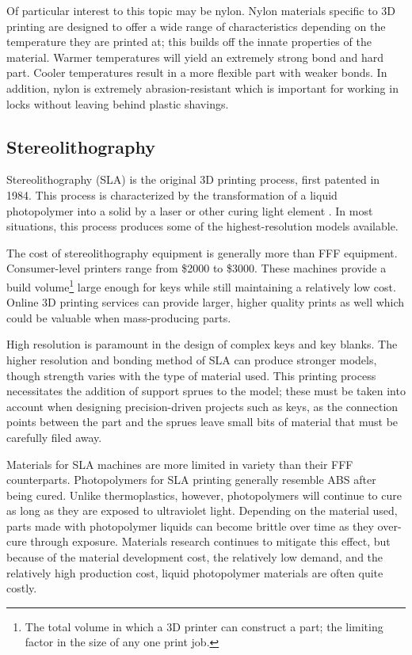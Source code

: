 \documentclass{acm_proc_article-sp}
\begin{document}
Of particular interest to this topic may be nylon. Nylon materials specific to 3D printing are designed to offer a wide range of characteristics depending on the temperature they are printed at; this builds off the innate properties of the material. Warmer temperatures will yield an extremely strong bond and hard part. Cooler temperatures result in a more flexible part with weaker bonds. In addition, nylon is extremely abrasion-resistant which is important for working in locks without leaving behind plastic shavings.

\subsection{Stereolithography}
Stereolithography (SLA) is the original 3D printing process, first patented in 1984. This process is characterized by the transformation of a liquid photopolymer into a solid by a laser or other curing light element \cite{HULL}. In most situations, this process produces some of the highest-resolution models available.

The cost of stereolithography equipment is generally more than FFF equipment. Consumer-level printers range from \$2000 to \$3000. These machines provide a build volume\footnote{The total volume in which a 3D printer can construct a part; the limiting factor in the size of any one print job.} large enough for keys while still maintaining a relatively low cost. Online 3D printing services can provide larger, higher quality prints as well which could be valuable when mass-producing parts.

High resolution is paramount in the design of complex keys and key blanks. The higher resolution and bonding method of SLA can produce stronger models, though strength varies with the type of material used. This printing process necessitates the addition of support sprues to the model; these must be taken into account when designing precision-driven projects such as keys, as the connection points between the part and the sprues leave small bits of material that must be carefully filed away.

Materials for SLA machines are more limited in variety than their FFF counterparts. Photopolymers for SLA printing generally resemble ABS after being cured. Unlike thermoplastics, however, photopolymers will continue to cure as long as they are exposed to ultraviolet light. Depending on the material used, parts made with photopolymer liquids can become brittle over time as they over-cure through exposure. Materials research continues to mitigate this effect, but because of the material development cost, the relatively low demand, and the relatively high production cost, liquid photopolymer materials are often quite costly.
\end{document}
